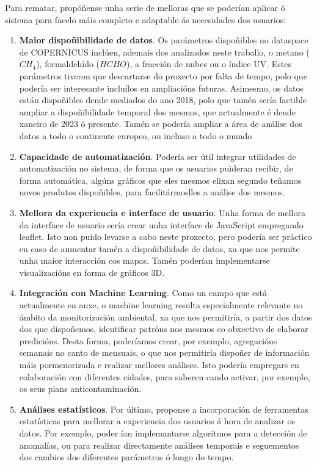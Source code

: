 Para rematar, propóñense unha serie de melloras que se poderían aplicar ó sistema para facelo máis completo e adaptable ás necesidades dos usuarios:
\begin{enumerate}
    \item \textbf{Maior dispoñibilidade de datos}. Os parámetros dispoñibles no dataspace de COPERNICUS inclúen, ademais dos analizados neste traballo, o metano ($CH_4$), formaldehído ($HCHO$), a
    fracción de nubes ou o índice UV. Estes parámetros tiveron que descartarse do proxecto por falta de tempo, polo que podería ser interesante incluílos en ampliacións futuras. Asimesmo, os datos
    están dispoñibles dende mediados do ano 2018, polo que tamén sería factible ampliar a dispoñibilidade temporal dos mesmos, que actualmente é dende xaneiro de 2023 ó presente. Tamén se podería
    ampliar a área de análise dos datos a todo o continente europeo, ou incluso a todo o mundo
    \item \textbf{Capacidade de automatización}. Podería ser útil integrar utilidades de automatización no sistema, de forma que os usuarios puideran recibir, de forma automática, algúns gráficos
    que eles mesmos elixan segundo teñamos novos produtos dispoñibles, para facilitármoslles a análise dos mesmos.
    \item \textbf{Mellora da experiencia e interface de usuario}. Unha forma de mellora da interface de usuario sería crear unha interface de JavaScript empregando leaflet. Isto non puido levarse a
    cabo neste proxecto, pero podería ser práctico en caso de aumentar tamén a dispoñibilidade de datos, xa que nos permite unha maior interacción cos mapas. Tamén poderían implementarse
    visualizacións en forma de gráficos 3D.
    \item \textbf{Integración con Machine Learning}. Como un campo que está actualmente en auxe, o machine learning resulta especialmente relevante no ámbito da monitorización ambiental, xa que nos
    permitiría, a partir dos datos dos que dispoñemos, identificar patróns nos mesmos co obxectivo de elaborar predicións. Desta forma, poderíamos crear, por exemplo, agregacións semanais no canto
    de mensuais, o que nos permitiría dispoñer de información máis pormenorizada e realizar mellores análises. Isto podería empregars en colaboración con diferentes cidades, para saberen cando
    activar, por exemplo, os seus plans anticontaminación.
    \item \textbf{Análises estatísticos}. Por último, proponse a incorporación de ferramentas estatísticas para mellorar a experiencia dos usuarios á hora de analizar os datos. Por exemplo, poder
    ían implemantarse algoritmos para a detección de anomalías, ou para realizar directamente análises temporais e seguementos dos cambios dos diferentes parámetros ó longo do tempo.
\end{enumerate}
